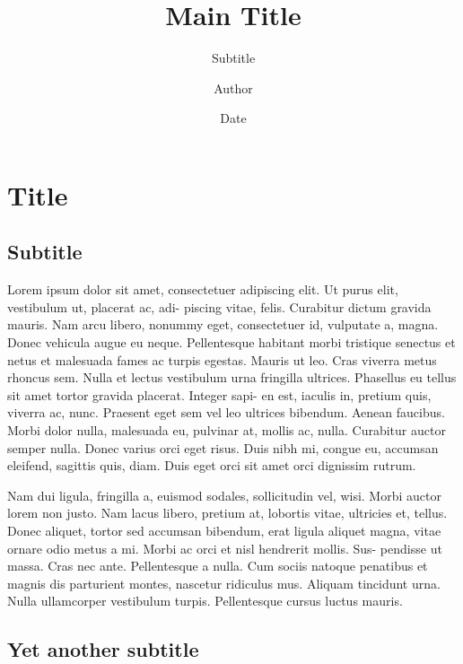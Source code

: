 \documentclass[english]{uzhpub}
\begin{document}
\title{Main Title}

\subtitle{Subtitle}

\author{Author}

\date{Date}

\maketitle


\section{Title}

\subsection{Subtitle}

Lorem ipsum dolor sit amet, consectetuer adipiscing elit. Ut purus
elit, vestibulum ut, placerat ac, adi- piscing vitae, felis. Curabitur
dictum gravida mauris. Nam arcu libero, nonummy eget, consectetuer
id, vulputate a, magna. Donec vehicula augue eu neque. Pellentesque
habitant morbi tristique senectus et netus et malesuada fames ac turpis
egestas. Mauris ut leo. Cras viverra metus rhoncus sem. Nulla et lectus
vestibulum urna fringilla ultrices. Phasellus eu tellus sit amet tortor
gravida placerat. Integer sapi- en est, iaculis in, pretium quis,
viverra ac, nunc. Praesent eget sem vel leo ultrices bibendum. Aenean
faucibus. Morbi dolor nulla, malesuada eu, pulvinar at, mollis ac,
nulla. Curabitur auctor semper nulla. Donec varius orci eget risus.
Duis nibh mi, congue eu, accumsan eleifend, sagittis quis, diam. Duis
eget orci sit amet orci dignissim rutrum. 

Nam dui ligula, fringilla a, euismod sodales, sollicitudin vel, wisi.
Morbi auctor lorem non justo. Nam lacus libero, pretium at, lobortis
vitae, ultricies et, tellus. Donec aliquet, tortor sed accumsan bibendum,
erat ligula aliquet magna, vitae ornare odio metus a mi. Morbi ac
orci et nisl hendrerit mollis. Sus- pendisse ut massa. Cras nec ante.
Pellentesque a nulla. Cum sociis natoque penatibus et magnis dis parturient
montes, nascetur ridiculus mus. Aliquam tincidunt urna. Nulla ullamcorper
vestibulum turpis. Pellentesque cursus luctus mauris. 

\subsection{Yet another subtitle}
\end{document}
